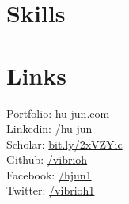 \documentclass[]{junhu_resume}
\begin{document}
\begin{minipage}[t]{0.28\textwidth}
\section{Skills}
{}
\location{Graph Database \textbullet{} SQL \textbullet{} Hive
}
\sectionsep



\section{Links} 
Portfolio: \href{http://www.hu-jun.com}{hu-jun.com}\\
Linkedin: \href{https://www.linkedin.com/in/jun-hu-664639a2/}{/hu-jun} \\
Scholar: \href{https://scholar.google.com/citations?user=Vr8dYJsAAAAJ&hl=en}{bit.ly/2xVZYic}\\
Github: \href{https://github.com/vibrioh}{/vibrioh}\\
Facebook: \href{https://www.facebook.com/hjun1}{/hjun1}\\
Twitter: \href{https://twitter.com/vibrioh1}{/vibrioh1}\\
\sectionsep

%
%

\end{minipage} 
\end{document}
